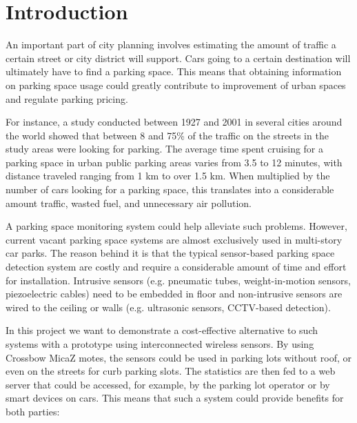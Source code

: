 \chapter{Introduction}
\label{introduction}
\noindent An important part of city planning involves estimating the amount of traffic a certain street or city district will support.
Cars going to a certain destination will ultimately have to find a parking space. 
This means that obtaining information on parking space usage could greatly contribute to improvement of urban spaces and regulate parking pricing.

For instance, a study conducted between 1927 and 2001 \cite{cruising_for_parking_2007} in several cities around the world showed 
that between 8 and 75\% of the traffic on the streets in the study areas were looking for parking.
The average time spent cruising for a parking space in urban public parking areas varies from 3.5 to 12 minutes, 
with distance traveled ranging from 1 km to over 1.5 km. 
When multiplied by the number of cars looking for a parking space, this translates into a considerable amount traffic, wasted fuel, and unnecessary air pollution.

A parking space monitoring system could help alleviate such problems. However, current vacant parking space systems are almost exclusively used in multi-story car parks.
The reason behind it is that the typical sensor-based parking space detection system are costly and require a considerable amount of time and effort for installation.
Intrusive sensors (e.g. pneumatic tubes, weight-in-motion sensors, piezoelectric cables) need to be embedded in floor and non-intrusive sensors are wired to 
the ceiling or walls (e.g. ultrasonic sensors, CCTV-based detection).

In this project we want to demonstrate a cost-effective alternative to such systems with a prototype using interconnected wireless sensors.
By using Crossbow MicaZ motes, the sensors could be used in parking lots without roof, or even on the streets for curb parking slots.
The statistics are then fed to a web server that could be accessed, for example, by the parking lot operator or by smart devices on cars.
This means that such a system could provide benefits for both parties:

